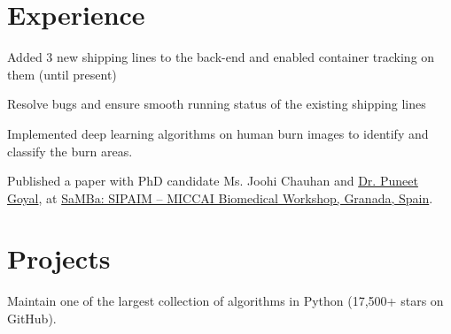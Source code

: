 \documentclass[]{deedy-resume-openfont}
\begin{document}
\hfill
\begin{minipage}[t]{0.66\textwidth} 


\section{Experience}
\vspace{\topsep}
\begin{tightemize}
\item Added 3 new shipping lines to the back-end and enabled container tracking on them (until present)
\item Resolve bugs and ensure smooth running status of the existing shipping lines 
\end{tightemize}

\sectionsep
{}
\begin{tightemize}
\item Implemented deep learning algorithms on human burn images to identify and classify the burn areas.
\item Published a paper with PhD candidate Ms. Joohi Chauhan and \href{http://www.iitrpr.ac.in/cse/puneet}{Dr. Puneet Goyal}, 
at \href{http://sipaim.org/samba/}{SaMBa: SIPAIM – MICCAI Biomedical Workshop, Granada, Spain}.
\end{tightemize}
\sectionsep


\section{Projects}

\begin{tightemize}
\item Maintain one of the largest collection of algorithms in Python (17,500+ stars on GitHub). 
\end{tightemize}
\sectionsep


\end{minipage}
\end{document}
